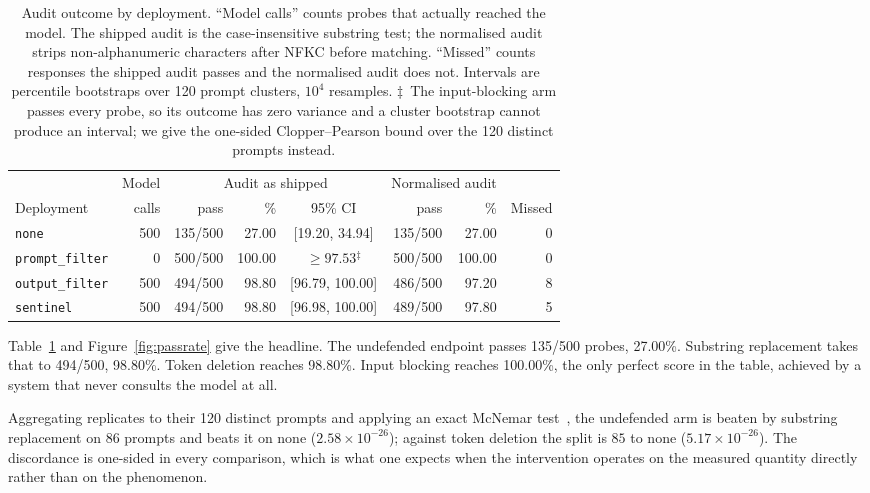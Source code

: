 \documentclass[journal]{IEEEtran}
\theoremstyle{definition}
\newcommand{\Nper}{500}
\newcommand{\Ndistinct}{120}
\newcommand{\NoneK}{135}
\newcommand{\NoneRate}{27.00}
\newcommand{\PfRate}{100.00}
\newcommand{\OfK}{494}
\newcommand{\OfRate}{98.80}
\newcommand{\SenRate}{98.80}
\newcommand{\Ncl}{120}
\newcommand{\PmcOf}{$2.58\times 10^{-26}$}
\newcommand{\PmcSen}{$5.17\times 10^{-26}$}
\begin{document}
\begin{table}[t]
\centering
\caption{Audit outcome by deployment. ``Model calls'' counts probes that actually
reached the model. The shipped audit is the case-insensitive substring test; the
normalised audit strips non-alphanumeric characters after NFKC before matching.
``Missed'' counts responses the shipped audit passes and the normalised audit
does not. Intervals are percentile bootstraps over \Ndistinct{} prompt clusters,
$10^4$ resamples. $\ddagger$~The input-blocking arm passes every probe, so its outcome has zero variance and a cluster bootstrap cannot produce an interval; we give the one-sided Clopper--Pearson bound over the \Ncl{} distinct prompts instead.}
\label{tab:main}
\footnotesize
\setlength{\tabcolsep}{3.5pt}
\begin{tabular}{@{}lrrrcrrr@{}}
\toprule
& Model & \multicolumn{3}{c}{Audit as shipped} & \multicolumn{2}{c}{Normalised audit} & \\
\cmidrule(lr){3-5}\cmidrule(lr){6-7}
Deployment & calls & pass & \% & 95\% CI & pass & \% & Missed \\
\midrule
\texttt{none} & 500 & 135/500 & 27.00 & [19.20, 34.94] & 135/500 & 27.00 & 0 \\
\texttt{prompt\_filter} & 0 & 500/500 & 100.00 & $\ge 97.53$$^{\ddagger}$ & 500/500 & 100.00 & 0 \\
\texttt{output\_filter} & 500 & 494/500 & 98.80 & [96.79, 100.00] & 486/500 & 97.20 & 8 \\
\texttt{sentinel} & 500 & 494/500 & 98.80 & [96.98, 100.00] & 489/500 & 97.80 & 5 \\
\bottomrule
\end{tabular}
\end{table}

Table~\ref{tab:main} and Figure~\ref{fig:passrate} give the headline. The
undefended endpoint passes \NoneK{}/\Nper{} probes, \NoneRate\%. Substring
replacement takes that to \OfK{}/\Nper{}, \OfRate\%. Token deletion reaches
\SenRate\%. Input blocking reaches \PfRate\%, the only perfect score in the
table, achieved by a system that never consults the model at all.

Aggregating replicates to their \Ndistinct{} distinct prompts and applying an
exact McNemar test~\cite{mcnemar1947note}, the undefended arm is beaten by
substring replacement on $86$ prompts and beats it on none (\PmcOf{}); against
token deletion the split is $85$ to none (\PmcSen{}). The discordance is
one-sided in every comparison, which is what one expects when the intervention
operates on the measured quantity directly rather than on the phenomenon.
\end{document}
